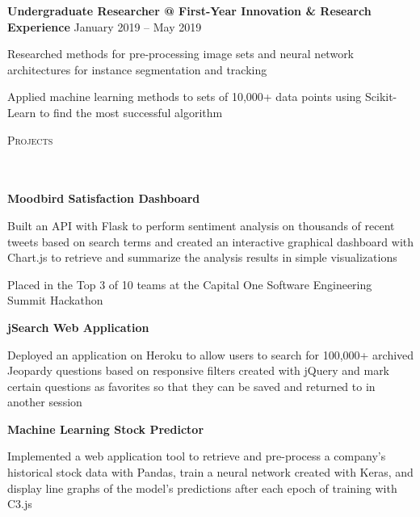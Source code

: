 \documentclass{article}
\newcommand{\header}[1]{{
\hspace*{-15pt}\vspace*{6pt} \large \scshape{#1}} \vspace*{-6pt} 
\lineunder
}
\newcommand{\lineunder}{
\vspace*{-8pt} \\ \hspace*{-18pt} 
\hrulefill \\
}
\newcommand{\employer}[4]{{
\vspace*{2pt}%
\textbf{#1} #2 \hfill #3\\ #4 \vspace*{2pt}}
}
\newcommand{\project}[4]{{
\vspace*{2pt}%
\textbf{#1} #2 \hfill #3\\ #4 \vspace*{2pt}}
}
\renewcommand{\labelitemii}{
$\vcenter{\hbox{\tiny$\bullet$}}$\hspace*{-3pt}
}
\newenvironment{bullet-list-minor}{
\begin{list}{\labelitemii}{\setlength\leftmargin{15pt} 
\topsep 0pt \itemsep -2pt}}{\vspace*{4pt}\end{list}
}
\begin{document}
    \smallskip    
    \employer{Undergraduate Researcher @ First-Year Innovation \& Research Experience}{}{January 2019 -- May 2019}{}
	\begin{bullet-list-minor}
	\item Researched methods for pre-processing image sets and neural network architectures for instance segmentation and tracking
	\item Applied machine learning methods to sets of 10,000+ data points using Scikit-Learn to find the most successful algorithm
    \end{bullet-list-minor}

\medskip

\header{Projects}
    \vspace{4pt}
    \project{Moodbird Satisfaction Dashboard}{}{}{}
	\begin{bullet-list-minor} 
	\item Built an API with Flask to perform sentiment analysis on thousands of recent tweets based on search terms and created an interactive graphical dashboard with Chart.js to retrieve and summarize the analysis results in simple visualizations
	\item Placed in the Top 3 of 10 teams at the Capital One Software Engineering Summit Hackathon
    \end{bullet-list-minor}
    \smallskip
    \project{jSearch Web Application}{}{}{}
	\begin{bullet-list-minor}
	\item Deployed an application on Heroku to allow users to search for 100,000+ archived Jeopardy questions based on responsive filters created with jQuery and mark certain questions as favorites so that they can be saved and returned to in another session
    \end{bullet-list-minor}
    \smallskip    
    \project{Machine Learning Stock Predictor}{}{}{}
	\begin{bullet-list-minor}
	\item Implemented a web application tool to retrieve and pre-process a company's historical stock data with Pandas, train a neural network created with Keras, and display line graphs of the model's predictions after each epoch of training with C3.js
    \end{bullet-list-minor}
\end{document}
